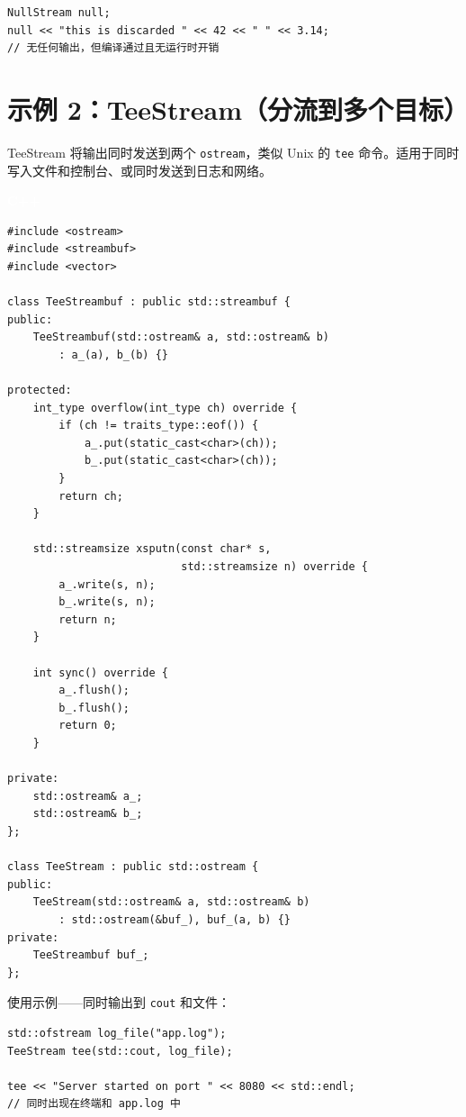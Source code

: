 \documentclass[12pt,a4paper,fontset=fandol]{ctexbook}
\newcommand{\Tp}[1]{\texttt{#1}}
\newcommand{\cpplabel}{%
  \noindent\begin{tcolorbox}[sharp corners,colback=algheadbg,colframe=algheadbg,
    left=6pt,right=6pt,top=2pt,bottom=2pt,boxrule=0pt]
  \textcolor{white}{\small\bfseries\sffamily C++}\end{tcolorbox}%
}
\begin{document}
\begin{lstlisting}
NullStream null;
null << "this is discarded " << 42 << " " << 3.14;
// 无任何输出，但编译通过且无运行时开销
\end{lstlisting}

\section{示例 2：TeeStream（分流到多个目标）}

TeeStream 将输出同时发送到两个 \Tp{ostream}，类似 Unix 的 \texttt{tee} 命令。适用于同时写入文件和控制台、或同时发送到日志和网络。

\cpplabel
\begin{lstlisting}
#include <ostream>
#include <streambuf>
#include <vector>

class TeeStreambuf : public std::streambuf {
public:
    TeeStreambuf(std::ostream& a, std::ostream& b)
        : a_(a), b_(b) {}

protected:
    int_type overflow(int_type ch) override {
        if (ch != traits_type::eof()) {
            a_.put(static_cast<char>(ch));
            b_.put(static_cast<char>(ch));
        }
        return ch;
    }

    std::streamsize xsputn(const char* s,
                           std::streamsize n) override {
        a_.write(s, n);
        b_.write(s, n);
        return n;
    }

    int sync() override {
        a_.flush();
        b_.flush();
        return 0;
    }

private:
    std::ostream& a_;
    std::ostream& b_;
};

class TeeStream : public std::ostream {
public:
    TeeStream(std::ostream& a, std::ostream& b)
        : std::ostream(&buf_), buf_(a, b) {}
private:
    TeeStreambuf buf_;
};
\end{lstlisting}

使用示例——同时输出到 \Tp{cout} 和文件：

\begin{lstlisting}
std::ofstream log_file("app.log");
TeeStream tee(std::cout, log_file);

tee << "Server started on port " << 8080 << std::endl;
// 同时出现在终端和 app.log 中
\end{lstlisting}
\end{document}
